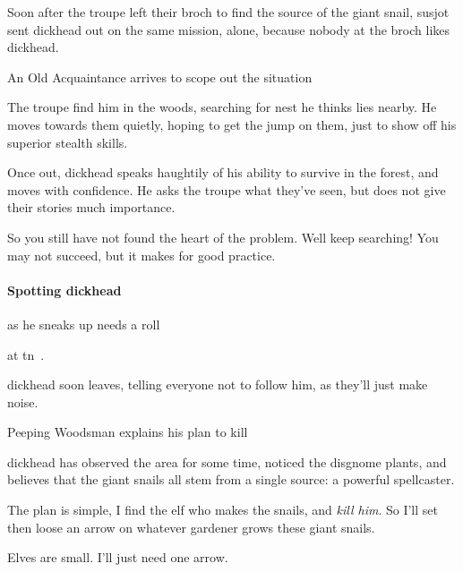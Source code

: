 \begin{multicols}{2}

\noindent
Soon after the troupe left their \gls{broch} to find the source of the giant snail, \gls{susjot} sent \gls{dickhead} out on the same mission, alone, because nobody at the \gls{broch} likes \gls{dickhead}.

{An Old Acquaintance}%
{ arrives to scope out the situation}%

The troupe find him in the woods, searching for  nest he thinks lies nearby.
He moves towards them quietly, hoping to get the jump on them, just to show off his superior stealth \glspl{skill}.

Once out, \gls{dickhead} speaks haughtily of his ability to survive in the forest, and moves with confidence.
He asks the troupe what they've seen, but does not give their stories much importance.

\begin{speechtext}
  So you still have not found the heart of the problem.
  Well keep searching!
  You may not succeed, but it makes for good practice.
\end{speechtext}

\dickhead

\paragraph{Spotting \gls{dickhead}}
as he sneaks up needs a  roll
%
\addtocounter{track}{\value{Dexterity}}%
\addtocounter{track}{\value{Stealth}}%
at \gls{tn}~.

\Gls{dickhead} soon leaves, telling everyone not to follow him, as they'll just make noise.

{Peeping Woodsman}%
{ explains his plan to kill }%

\Gls{dickhead} has observed the area for some time, noticed the \gls{disgnome} plants, and believes that the giant snails all stem from a single source: a powerful spellcaster.

\begin{speechtext}
  The plan is simple, I find the elf who makes the snails, and \emph{kill him}.
  So I'll set  then loose an arrow on whatever gardener grows these giant snails.

  Elves are small.
  I'll just need one arrow.
\end{speechtext}


\end{multicols}
